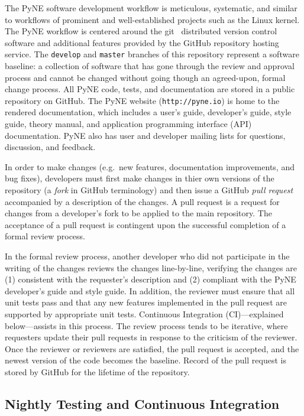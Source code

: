 \documentclass{anstrans}
\begin{document}
The PyNE software development workflow is meticulous, systematic, and similar
to workflows of prominent and well-established projects such as the Linux kernel.
The PyNE workflow is centered around the git~\cite{git_2014} distributed version control software
and additional features provided by the GitHub repository hosting service.
The \texttt{develop} and \texttt{master} branches of this repository represent
a software baseline: a collection of software that has gone through the review and
approval process and cannot be changed without going though an agreed-upon, formal change process.
All PyNE code, tests, and documentation are stored in a public
repository on GitHub. The PyNE website (\texttt{http://pyne.io}) is home to the
rendered documentation, which includes a user's guide, developer's guide, style
guide, theory manual, and application programming interface (API) documentation.
PyNE also has user and developer mailing lists for questions, discussion, and feedback.

In order to make changes (e.g.\ new features, documentation improvements, and
bug fixes), developers must first make changes in thier own versions of the
repository (a \emph{fork} in GitHub terminology) and then issue a GitHub \emph{pull
request} accompanied by a description of the changes. A pull request
is a request for changes from a developer's fork to be applied to the main
repository. The acceptance of a pull request is contingent upon the
successful completion of a formal review process.

In the formal review process, another developer who did not participate in the writing of the changes
reviews the changes line-by-line, verifying the changes are (1) consistent with
the requester's description and (2) compliant with the PyNE
developer's guide and style guide. In addition, the reviewer must
ensure that all unit tests pass and that
any new features implemented in the pull request are supported by appropriate unit
tests. Continuous Integration (CI)---explained below---assists in this process.
The review process tends to be iterative, where requesters update their pull
requests in response to the criticism of the reviewer. Once the reviewer or
reviewers are satisfied, the pull request is accepted, and the newest version of the
code becomes the baseline. Record of the pull request is stored by GitHub for the lifetime of the repository.

\subsection{Nightly Testing and Continuous Integration} 
\end{document}

